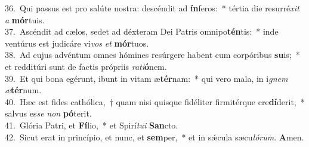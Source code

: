 {36.~}Qui passus est pro salúte nostra: descéndit ad \textbf{ín}feros:~* tértia die resurré\textit{xit} \textit{a} \textbf{mór}tuis.\\
{37.~}Ascéndit ad cælos, sedet ad déxteram Dei Patris omnipo\textbf{tén}tis:~* inde ventúrus est judicáre vi\textit{vos} \textit{et} \textbf{mór}tuos.\\
{38.~}Ad cujus advéntum omnes hómines resúrgere habent cum corpóribus \textbf{su}is;~* et redditúri sunt de factis própriis \textit{ra}\textit{ti}\textbf{ó}nem.\\
{39.~}Et qui bona egérunt, ibunt in vitam æ\textbf{tér}nam:~* qui vero mala, in i\textit{gnem} \textit{æ}\textbf{tér}num.\\
{40.~}Hæc est fides cathólica,~† quam nisi quisque fidéliter firmitérque cre\textbf{dí}derit,~* salvus es\textit{se} \textit{non} \textbf{pó}terit.\\
{41.~}Glória Patri, et \textbf{Fí}lio,~* et Spirí\textit{tu}\textit{i} \textbf{San}cto.\\
{42.~}Sicut erat in princípio, et nunc, et \textbf{sem}per,~* et in sǽcula sæcu\textit{ló}\textit{rum}. \textbf{A}men.\\
